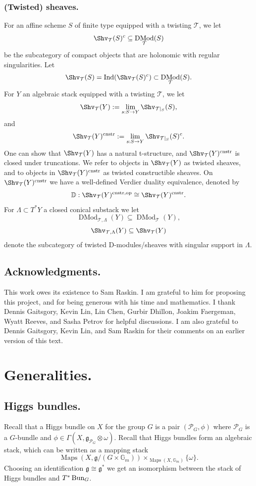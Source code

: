 \documentclass[9pt]{amsart}
\newcommand{\bD}{{\mathbb D}}
\newcommand{\bG}{{\mathbb G}}
\newcommand{\cP}{{\mathcal P}}
\newcommand{\cT}{{\mathcal T}}
\DeclareMathOperator{\Maps}{{Maps}}
\numberwithin{equation}{section}
\DeclareMathOperator{\D}{{DMod}}
\begin{document}
	\subsubsection{(Twisted) sheaves.} 
	For an affine scheme $S$ of finite type equipped with a twisting $\cT$, we let $$\Shv_{\cT}(S)^c \subseteq \D_{\cT}(S)$$
be the subcategory of compact objects that are holonomic with regular singularities. Let $$\Shv_{\cT}(S) = \Ind(\Shv_{\cT}(S)^c) \subset \D_{\cT}(S).$$
For $Y$ an algebraic stack equipped with a twisting $\cT$, we let 
$$\Shv_{\cT}(Y):= \lim_{s: S \rightarrow Y}\Shv_{\cT|_S}(S),$$
and $$\Shv_{\cT}(Y)^{\operatorname{cnstr}}:= \lim_{s: S \rightarrow Y}\Shv_{\cT|_S}(S)^c.$$
One can show that $\Shv_{\cT}(Y)$ has a natural t-structure, and $\Shv_{\cT}(Y)^{\operatorname{cnstr}}$ is closed under truncations. We refer to objects in $\Shv_{\cT}(Y)$ as twisted sheaves, and to objects in $\Shv_{\cT}(Y)^{\operatorname{cnstr}}$ as twisted constructible sheaves. On $\Shv_{\cT}(Y)^{\operatorname{cnstr}}$ we have a well-defined Verdier duality equivalence, denoted by $$\bD: \Shv_{\cT}(Y)^{\operatorname{cnstr}, \op} \cong \Shv_{\cT}(Y)^{\operatorname{cnstr}}.$$
For $\Lambda \subset T^*Y$ a closed conical substack we let $$\D_{\cT, \Lambda}(Y) \subseteq \D_{\cT}(Y),$$
$$\Shv_{\cT, \Lambda}(Y) \subseteq \Shv_{\cT}(Y)$$
denote the subcategory of twisted D-modules/sheaves with singular support in $\Lambda$.
	
	
	\subsection{Acknowledgments.} This work owes its existence to Sam Raskin. I am grateful to him for proposing this project, and for being generous with his time and mathematics. I thank Dennis Gaitsgory, Kevin Lin, Lin Chen, Gurbir Dhillon, Joakim Faergeman, Wyatt Reeves, and Sasha Petrov for helpful discussions. I am also grateful to Dennis Gaitsgory, Kevin Lin, and Sam Raskin for their comments on an earlier version of this text.
	
	
	\section{Generalities.}
	
		\subsection{Higgs bundles.}\label{higgs}
	Recall that a Higgs bundle on $X$ for the group $G$ is a pair $(\cP_G, \phi)$ where $\cP_G$ is a
	$G$-bundle and $\phi \in \Gamma(X, \mathfrak{g}_{\cP_G} \otimes \omega) $.
	Recall that Higgs bundles form an algebraic stack, which can be written as a mapping
	stack
	$$\Maps(X, \mathfrak{g}/(G \times\bG_m)) \times_{\Maps(X,\bG_m)} \{\omega\}.$$
	Choosing an identification $\mathfrak{g} \cong \mathfrak{g}^*$ we get an isomorphism between the stack of Higgs bundles and $T^*\operatorname{{Bun}}_G$.
	
\end{document}
